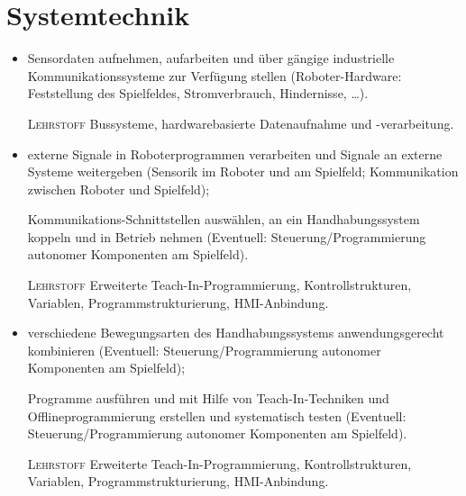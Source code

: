 \section{Systemtechnik}

\begin{itemize}[label={-}]
    \item Sensordaten aufnehmen, aufarbeiten und über gängige industrielle Kommunikationssysteme zur Verfügung stellen
        {\color{red}(Roboter-Hardware: Feststellung des Spielfeldes, Stromverbrauch, Hindernisse, \dots)}.
    \item[\tiny\textsc{Lehrstoff}] Bussysteme, hardwarebasierte Datenaufnahme und -verarbeitung.\lehrstoffrule
 
    \item externe Signale in Roboterprogrammen verarbeiten und Signale an externe Systeme weitergeben
        {\color{red}(Sensorik im Roboter und am Spielfeld; Kommunikation zwischen Roboter und Spielfeld)};
    \item[] Kommunikations-Schnittstellen auswählen, an ein Handhabungssystem koppeln und in Betrieb nehmen
        {\color{red}(Eventuell: Steuerung/Programmierung autonomer Komponenten am Spielfeld)}.
    \item[\tiny\textsc{Lehrstoff}] Erweiterte Teach-In-Programmierung, Kontrollstrukturen, Variablen, Programmstrukturierung, HMI-Anbindung.\lehrstoffrule
 
    \item verschiedene Bewegungsarten des Handhabungssystems anwendungsgerecht kombinieren
        {\color{red}(Eventuell: Steuerung/Programmierung autonomer Komponenten am Spielfeld)};
    \item[] Programme ausführen und mit Hilfe von Teach-In-Techniken und Offlineprogrammierung erstellen und systematisch testen
        {\color{red}(Eventuell: Steuerung/Programmierung autonomer Komponenten am Spielfeld)}.
    \item[\tiny\textsc{Lehrstoff}] Erweiterte Teach-In-Programmierung, Kontrollstrukturen, Variablen, Programmstrukturierung, HMI-Anbindung.
\end{itemize}



